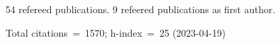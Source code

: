 54 refereed publications. 9 refeered publications as first author.

Total citations~=~1570; h-index~=~25 (2023-04-19)